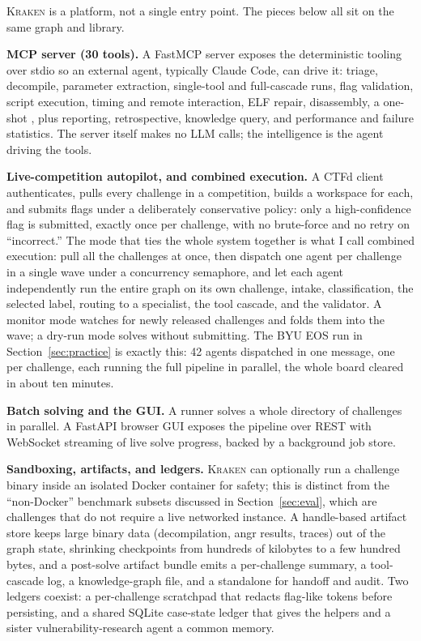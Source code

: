 \documentclass[10pt,twocolumn]{article}
\newcommand{\kraken}{\textsc{Kraken}}
\newcommand{\code}[1]{\seqsplit{\texttt{#1}}}
\begin{document}
\kraken{} is a platform, not a single entry point. The pieces below all sit on the same graph and library.

\medskip
\textbf{MCP server (30 tools).} A FastMCP server exposes the deterministic tooling over stdio so an
external agent, typically Claude Code, can drive it: triage, decompile, parameter extraction, single-tool
and full-cascade runs, flag validation, script execution, timing and remote interaction, ELF repair,
disassembly, a one-shot \code{kraken\_full\_solve}, plus reporting, retrospective, knowledge query, and
performance and failure statistics. The server itself makes no LLM calls; the intelligence is the agent
driving the tools.

\medskip
\textbf{Live-competition autopilot, and combined execution.} A CTFd client authenticates, pulls every
challenge in a competition, builds a workspace for each, and submits flags under a deliberately conservative
policy: only a high-confidence flag is submitted, exactly once per challenge, with no brute-force and no retry
on ``incorrect.'' The mode that ties the whole system together is what I call combined execution: pull all the
challenges at once, then dispatch one agent per challenge in a single wave under a concurrency semaphore, and
let each agent independently run the entire graph on its own challenge, intake, classification, the selected
label, routing to a specialist, the tool cascade, and the validator. A monitor mode watches for newly released
challenges and folds them into the wave; a dry-run mode solves without submitting. The BYU EOS run in
Section~\ref{sec:practice} is exactly this: 42 agents dispatched in one message, one per challenge, each
running the full pipeline in parallel, the whole board cleared in about ten minutes.

\medskip
\textbf{Batch solving and the GUI.} A \code{solve-all} runner solves a whole directory of challenges in
parallel. A FastAPI browser GUI exposes the pipeline over REST with WebSocket streaming of live solve
progress, backed by a background job store.

\medskip
\textbf{Sandboxing, artifacts, and ledgers.} \kraken{} can optionally run a challenge binary inside an
isolated Docker container for safety; this is distinct from the ``non-Docker'' benchmark subsets discussed
in Section~\ref{sec:eval}, which are challenges that do not require a live networked instance. A handle-based
artifact store keeps large binary data (decompilation, angr results, traces) out of the graph state, shrinking
checkpoints from hundreds of kilobytes to a few hundred bytes, and a post-solve artifact bundle emits a
per-challenge summary, a tool-cascade log, a knowledge-graph file, and a standalone \code{reproduce.sh} for
handoff and audit. Two ledgers coexist: a per-challenge scratchpad that redacts flag-like tokens before
persisting, and a shared SQLite case-state ledger that gives the helpers and a sister vulnerability-research
agent a common memory.
\end{document}
